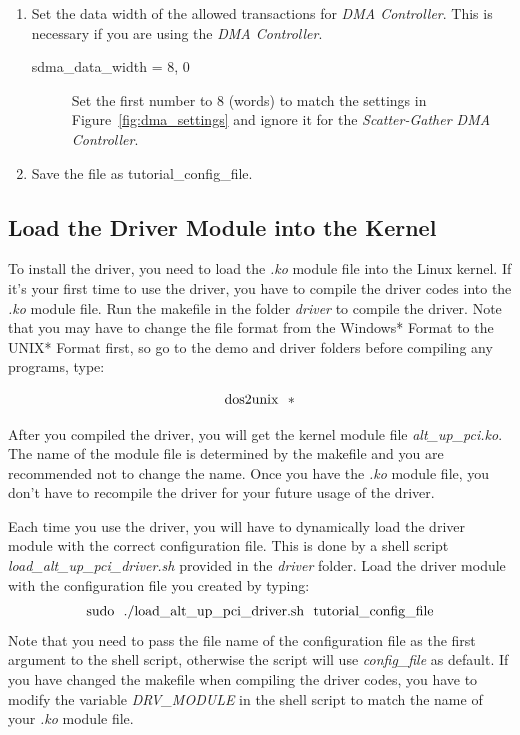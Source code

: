 \documentclass[11pt, twoside, pdftex]{article}
\begin{document}
\begin{enumerate}
\begin{description}
		\end{description}
	\item Set the data width of the allowed transactions for {\it DMA Controller}. This is necessary if you are using the {\it DMA Controller}. 
		\begin{description}
			\item[sdma\_data\_width = 8, 0] Set the first number to 8 (words) to match the settings in Figure~\ref{fig:dma_settings} and ignore it for the {\it Scatter-Gather DMA Controller}. 
		\end{description}
	\item Save the file as tutorial\_config\_file.
\end{enumerate}

\subsection{Load the Driver Module into the Kernel}
To install the driver, you need to load the {\it .ko} module file into the Linux kernel. If it's your first time to use the driver, you have to compile the driver codes into the {\it .ko} module file. Run the makefile in the folder {\it driver} to compile the driver. Note that you may have to change the file format from the Windows* Format to the UNIX* Format first, so go to the demo and driver folders before compiling any programs, type:
	
$$ {\rm dos2unix~~*} $$

After you compiled the driver, you will get the kernel module file {\it alt\_up\_pci.ko}. The name of the module file is determined by the makefile and you are recommended not to change the name. Once you have the {\it .ko} module file, you don't have to recompile the driver for your future usage of the driver.

Each time you use the driver, you will have to dynamically load the driver module with the correct configuration file. This is done by a shell script {\it load\_alt\_up\_pci\_driver.sh} provided in the {\it driver} folder. Load the driver module with the configuration file you created by typing:
$$ {\rm sudo~~./load\_alt\_up\_pci\_driver.sh~~tutorial\_config\_file} $$
Note that you need to pass the file name of the configuration file as the first argument to the shell script, otherwise the script will use {\it config\_file} as default. If you have changed the makefile when compiling the driver codes, you have to modify the variable {\it DRV\_MODULE} in the shell script to match the name of your {\it .ko} module file. 
\end{document}
